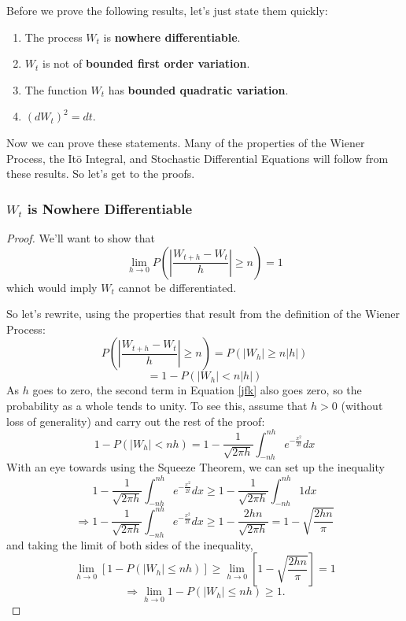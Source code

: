 \documentclass[a4paper,12pt]{scrartcl}
\begin{document}
Before we prove the following results, let's just state them quickly:
\begin{enumerate}
   \item{The process $W_t$ is \textbf{nowhere differentiable}.}
   \item{$W_t$ is not of \textbf{bounded first order variation}.}
   \item{The function $W_t$ has \textbf{bounded quadratic
      variation}.}
   \item{$(dW_t)^2 = dt$.}
\end{enumerate}
Now we can prove these statements. Many of the properties of the Wiener
Process, the It\={o} Integral, and Stochastic Differential Equations 
will follow from these results. So let's get to the proofs.

\subsubsection{$W_t$ is Nowhere Differentiable}
      \begin{proof}
	 We'll want to show that 
	    \[\lim_{h \rightarrow 0} P\left( \left\lvert 
	       \frac{W_{t+h} - W_t}{h} \right\rvert \geq n \right) =1 \]
	 which would imply $W_t$ cannot be differentiated.

	 So let's rewrite, using the properties that result from the
	 definition of the Wiener Process:
	    \[ P\left( \left\lvert \frac{W_{t+h} - W_t}{h} 
	       \right\rvert \geq n \right) = P(|W_h| \geq n|h|) \]
	 \begin{equation}
	    \label{jfk}
	     = 1 - P(|W_h| < n|h|) 
	 \end{equation}
	 As $h$ goes to zero, the second term in Equation \ref{jfk} also
	 goes zero, so the probability as a whole tends to unity.  To 
	 see this, assume that $h>0$ (without loss of generality) and
	 carry out the rest of the proof:
	 \[ 1- P(|W_h| < nh) = 1- \frac{1}{\sqrt{2\pi h}} \int^{nh}_{-nh}
	    e^{-\frac{x^2}{2t}} dx \]
	 With an eye towards using the Squeeze Theorem, we can set up
	 the inequality
	    \[   1- \frac{1}{\sqrt{2\pi h}} \int^{nh}_{-nh}
	       e^{-\frac{x^2}{2t}} dx \geq 1 - \frac{1}{\sqrt{2\pi h}} 
	       \int^{nh}_{-nh} 1 dx \]
	    \[ \Rightarrow  1- \frac{1}{\sqrt{2\pi h}} \int^{nh}_{-nh}
	       e^{-\frac{x^2}{2t}} dx \geq 1 -\frac{2hn}{ \sqrt{2\pi h}} 
	       = 1 - \sqrt{\frac{2hn}{\pi}} \]
	 and taking the limit of both sides of the inequality,
	 \[ \lim_{h\rightarrow 0}\left[1 - P(|W_h| \leq nh) \right] \geq 
	    \lim_{h\rightarrow 0} \left[ 1-\sqrt{\frac{2hn}{\pi}}\right] 
	    = 1 \]
	 \[ \Rightarrow \lim_{h\rightarrow 0} 1 - P(|W_h| \leq nh)
	    \geq 1.\]
	 \end{proof}
      
\end{document}
